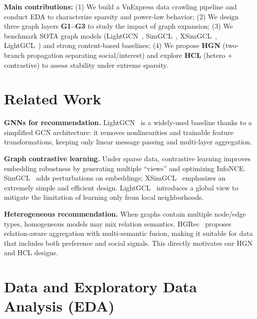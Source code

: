 \documentclass[11pt]{article}
\begin{document}
\noindent\textbf{Main contributions:}
(1) We build a VnExpress data crawling pipeline and conduct EDA to characterize sparsity and power-law behavior;
(2) We design three graph layers \textbf{G1--G3} to study the impact of graph expansion;
(3) We benchmark SOTA graph models (LightGCN~\citep{he2020lightgcn}, SimGCL~\citep{yu2022graph}, XSimGCL~\citep{yu2023xsimgcl}, LightGCL~\citep{cai2023lightgcl}) and strong content-based baselines;
(4) We propose \textbf{HGN} (two-branch propagation separating social/interest) and explore \textbf{HCL} (hetero + contrastive) to assess stability under extreme sparsity.

\section{Related Work}
\label{sec:related}

\textbf{GNNs for recommendation.}
LightGCN~\citep{he2020lightgcn} is a widely-used baseline thanks to a simplified GCN architecture: it removes nonlinearities and trainable feature transformations, keeping only linear message passing and multi-layer aggregation.

\textbf{Graph contrastive learning.}
Under sparse data, contrastive learning improves embedding robustness by generating multiple ``views'' and optimizing InfoNCE. SimGCL~\citep{yu2022graph} adds perturbations on embeddings; XSimGCL~\citep{yu2023xsimgcl} emphasizes an extremely simple and efficient design. LightGCL~\citep{cai2023lightgcl} introduces a global view to mitigate the limitation of learning only from local neighborhoods.

\textbf{Heterogeneous recommendation.}
When graphs contain multiple node/edge types, homogeneous models may mix relation semantics. HGRec~\citep{shi2020hgrec} proposes relation-aware aggregation with multi-semantic fusion, making it suitable for data that includes both preference and social signals. This directly motivates our HGN and HCL designs.

\section{Data and Exploratory Data Analysis (EDA)}
\label{sec:data}
\end{document}
